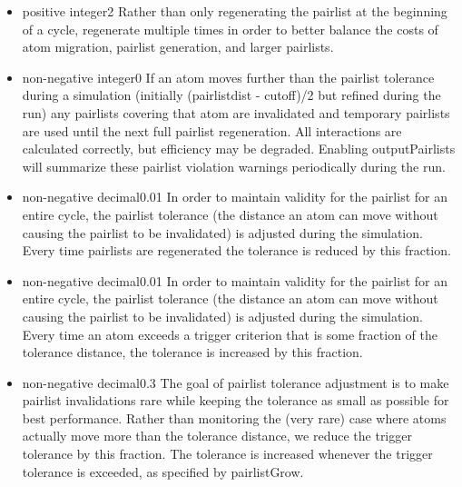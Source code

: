 \begin{itemize}
\item
{}
{positive integer}{2}
{
Rather than only regenerating the pairlist at the beginning of a cycle,
regenerate multiple times in order to better balance the costs of
atom migration, pairlist generation, and larger pairlists.
}

\item
{}
{non-negative integer}{0}
{
If an atom moves further than the pairlist tolerance during a simulation
(initially (pairlistdist - cutoff)/2 but refined during the run) any
pairlists covering that atom are invalidated and temporary pairlists
are used until the next full pairlist regeneration.  All interactions
are calculated correctly, but efficiency may be degraded.  Enabling
outputPairlists will summarize these pairlist violation warnings
periodically during the run.
}

\item
{}
{non-negative decimal}{0.01}
{
In order to maintain validity for the pairlist for an entire cycle,
the pairlist tolerance (the distance an atom can move without causing
the pairlist to be invalidated) is adjusted during the simulation.
Every time pairlists are regenerated the tolerance is reduced by
this fraction.
}

\item
{}
{non-negative decimal}{0.01}
{
In order to maintain validity for the pairlist for an entire cycle,
the pairlist tolerance (the distance an atom can move without causing
the pairlist to be invalidated) is adjusted during the simulation.
Every time an atom exceeds a trigger criterion that is some fraction
of the tolerance distance, the tolerance is increased by this fraction.
}

\item
{}
{non-negative decimal}{0.3}
{
The goal of pairlist tolerance adjustment is to make pairlist invalidations
rare while keeping the tolerance as small as possible for best performance.
Rather than monitoring the (very rare) case where atoms actually move more
than the tolerance distance, we reduce the trigger tolerance by this
fraction.  The tolerance is increased whenever the trigger tolerance is
exceeded, as specified by pairlistGrow.
}

\end{itemize}

